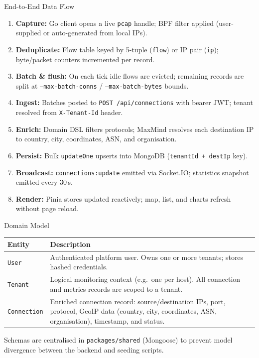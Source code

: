 \documentclass[aspectratio=169]{beamer}
\begin{document}
\begin{frame}{End-to-End Data Flow}
    \begin{enumerate}
        \item \textbf{Capture:} Go client opens a live \texttt{pcap} handle; BPF filter
              applied (user-supplied or auto-generated from local IPs).
        \item \textbf{Deduplicate:} Flow table keyed by 5-tuple (\texttt{flow}) or IP pair
              (\texttt{ip}); byte/packet counters incremented per record.
        \item \textbf{Batch \& flush:} On each tick idle flows are evicted; remaining records
              are split at \texttt{--max-batch-conns} / \texttt{--max-batch-bytes} bounds.
        \item \textbf{Ingest:} Batches posted to \texttt{POST /api/connections} with bearer
              JWT; tenant resolved from \texttt{X-Tenant-Id} header.
        \item \textbf{Enrich:} Domain DSL filters protocols; MaxMind resolves each
              destination IP to country, city, coordinates, ASN, and organisation.
        \item \textbf{Persist:} Bulk \texttt{updateOne} upserts into MongoDB
              (\texttt{tenantId + destIp} key).
        \item \textbf{Broadcast:} \texttt{connections:update} emitted via Socket.IO;
              statistics snapshot emitted every 30\,s.
        \item \textbf{Render:} Pinia stores updated reactively; map, list, and charts
              refresh without page reload.
    \end{enumerate}
\end{frame}

\begin{frame}{Domain Model}
    \begin{center}
    \begin{tabular}{lp{8.5cm}}
        \toprule
        \textbf{Entity} & \textbf{Description} \\
        \midrule
        \texttt{User}       & Authenticated platform user. Owns one or more tenants;
                               stores hashed credentials. \\
        \texttt{Tenant}     & Logical monitoring context (e.g.\ one per host). All
                               connection and metrics records are scoped to a tenant. \\
        \texttt{Connection} & Enriched connection record: source/destination IPs, port,
                               protocol, GeoIP data (country, city, coordinates, ASN,
                               organisation), timestamp, and status. \\
        \bottomrule
    \end{tabular}
    \end{center}
    \vspace{0.3cm}
    Schemas are centralised in \texttt{packages/shared} (Mongoose) to prevent
    model divergence between the backend and seeding scripts.
\end{frame}
\end{document}
